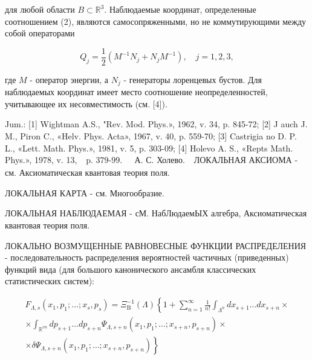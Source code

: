 \documentclass[10pt]{article}
\begin{document}
для любой области $B \subset \mathbb{R}^{3}$. Наблюдаемые координат, определенные соотношением (2), являются самосопряженными, но не коммутирующими между собой операторами



\[

Q_{j}=\frac{1}{2}\left(M^{-1} N_{j}+N_{j} M^{-1}\right), \quad j=1,2,3,

\]



где $M$ - оператор энергии, а $N_{j}$ - генераторы лоренцевых бустов. Для наблюдаемых координат имеет место соотношение неопределенностей, учитывающее их несовместимость (см. [4]).



Jum.: [1] Wightman A.S., "Rev. Mod. Phys.», 1962, v. 34, p. 845-72; [2] J auch J. M., Piron C., «Helv. Phys. Acta», 1967, v. 40, p. 559-70; [3] Castrigia no D. P. L., «Lett. Math. Phys.», 1981, v. 5, p. 303-09; [4] Holevo A. S., «Repts Math. Phys.», 1978, v. 13, $\begin{array}{ll}\text { p. 379-99. } & \text { А. С. Холево. }\end{array}$ ЛОКАЛЬНАЯ АКСИОМА - см. Аксиоматическая квантовая теория поля.



ЛОКАЛЬНАЯ КАРТА - см. Многообразие.



ЛОКАЛЬНАЯ НАБЛЮДАЕМАЯ - сМ. НабЛюдаемЫХ алгебра, Аксиоматическая квантовая теория поля.



ЛОКАЛЬНО ВОЗМУЩЕННЫЕ РАВНОВЕСНЫЕ ФУНКЦИИ РАСПРЕДЕЛЕНИЯ - последовательность распределения вероятностей частичных (приведенных) функций вида (для большого канонического ансамбля классических статистических систем):



\[

\begin{gathered}

F_{\Lambda, s}\left(x_{1}, p_{1} ; \ldots ; x_{s}, p_{s}\right)=\Xi_{\mathrm{B}}^{-1}(\Lambda)\left\{1+\sum_{n=1}^{\infty} \frac{1}{n !} \int_{\Lambda^{n}} d x_{s+1} \ldots d x_{s+n} \times\right. \\

\times \int_{\mathbb{R}^{v n}} d p_{s+1} \ldots d p_{s+n} \Psi_{\Lambda, s+n}\left(x_{1}, p_{1} ; \ldots ; x_{s+n}, p_{s+n}\right) \times \\

\left.\times \delta \Psi_{\Lambda, s+n}\left(x_{1}, p_{1} ; \ldots ; x_{s+n}, p_{s+n}\right)\right\}

\end{gathered}

\]
\end{document}
